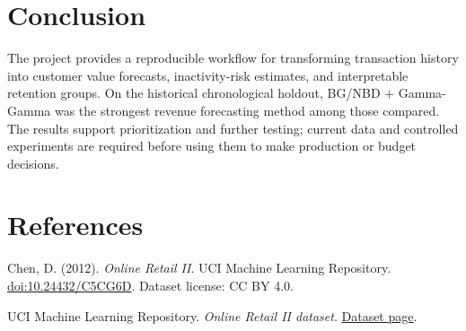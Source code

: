 \documentclass[11pt,a4paper]{article}
\begin{document}
\section{Conclusion}

The project provides a reproducible workflow for transforming transaction
history into customer value forecasts, inactivity-risk estimates, and
interpretable retention groups. On the historical chronological holdout,
BG/NBD + Gamma-Gamma was the strongest revenue forecasting method among those
compared. The results support prioritization and further testing; current
data and controlled experiments are required before using them to make
production or budget decisions.

\section*{References}
\begin{enumerate}[label={[\arabic*]},leftmargin=2em]
  \item Chen, D. (2012). \emph{Online Retail II}. UCI Machine Learning
  Repository. \href{https://doi.org/10.24432/C5CG6D}{doi:10.24432/C5CG6D}.
  Dataset license: CC BY 4.0.
  \item UCI Machine Learning Repository. \emph{Online Retail II dataset}.
  \href{https://archive.ics.uci.edu/dataset/502/online+retail+ii}{Dataset page}.
\end{enumerate}
\end{document}
